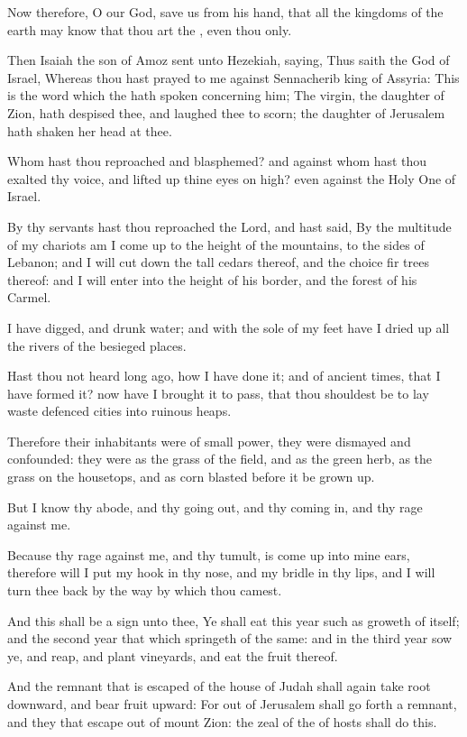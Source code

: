 \Verse Now therefore, O \LORD our God, save us from his hand, that all the kingdoms of the earth may know that thou art the \LORD, even thou only.

\Verse Then Isaiah the son of Amoz sent unto Hezekiah, saying, Thus saith the \LORD God of Israel, Whereas thou hast prayed to me against Sennacherib king of Assyria: \Verse This is the word which the \LORD hath spoken concerning him; The virgin, the daughter of Zion, hath despised thee, and laughed thee to scorn; the daughter of Jerusalem hath shaken her head at thee.

\Verse Whom hast thou reproached and blasphemed? and against whom hast thou exalted thy voice, and lifted up thine eyes on high? even against the Holy One of Israel.

\Verse By thy servants hast thou reproached the Lord, and hast said, By the multitude of my chariots am I come up to the height of the mountains, to the sides of Lebanon; and I will cut down the tall cedars thereof, and the choice fir trees thereof: and I will enter into the height of his border, and the forest of his Carmel.

\Verse I have digged, and drunk water; and with the sole of my feet have I dried up all the rivers of the besieged places.

\Verse Hast thou not heard long ago, how I have done it; and of ancient times, that I have formed it? now have I brought it to pass, that thou shouldest be to lay waste defenced cities into ruinous heaps.

\Verse Therefore their inhabitants were of small power, they were dismayed and confounded: they were as the grass of the field, and as the green herb, as the grass on the housetops, and as corn blasted before it be grown up.

\Verse But I know thy abode, and thy going out, and thy coming in, and thy rage against me.

\Verse Because thy rage against me, and thy tumult, is come up into mine ears, therefore will I put my hook in thy nose, and my bridle in thy lips, and I will turn thee back by the way by which thou camest.

\Verse And this shall be a sign unto thee, Ye shall eat this year such as groweth of itself; and the second year that which springeth of the same: and in the third year sow ye, and reap, and plant vineyards, and eat the fruit thereof.

\Verse And the remnant that is escaped of the house of Judah shall again take root downward, and bear fruit upward: \Verse For out of Jerusalem shall go forth a remnant, and they that escape out of mount Zion: the zeal of the \LORD of hosts shall do this.

